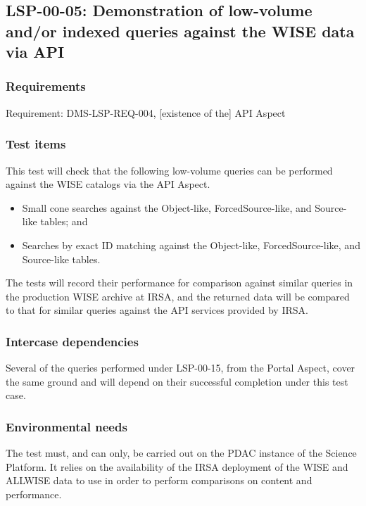 \subsection{LSP-00-05: Demonstration of low-volume and/or indexed queries against the WISE data via API}
\label{lsp-00-05}

\subsubsection{Requirements}

Requirement: DMS-LSP-REQ-004, [existence of the] API Aspect

\subsubsection{Test items}

This test will check that the following low-volume queries can be performed against the WISE catalogs via the API Aspect.

\begin{itemize}

  \item{Small cone searches against the Object-like, ForcedSource-like, and Source-like tables; and}
  \item{Searches by exact ID matching against the Object-like, ForcedSource-like, and Source-like tables.}

\end{itemize}

The tests will record their performance for comparison against similar queries in the production WISE archive at IRSA,
and the returned data will be compared to that for similar queries against the API services provided by IRSA.

\subsubsection{Intercase dependencies}

Several of the queries performed under LSP-00-15, from the Portal Aspect, cover the same ground and will depend on their successful completion under this test case.

\subsubsection{Environmental needs}

The test must, and can only, be carried out on the PDAC instance of the Science Platform.
It relies on the availability of the IRSA deployment of the WISE and ALLWISE data to use in order to perform comparisons on content and performance.

